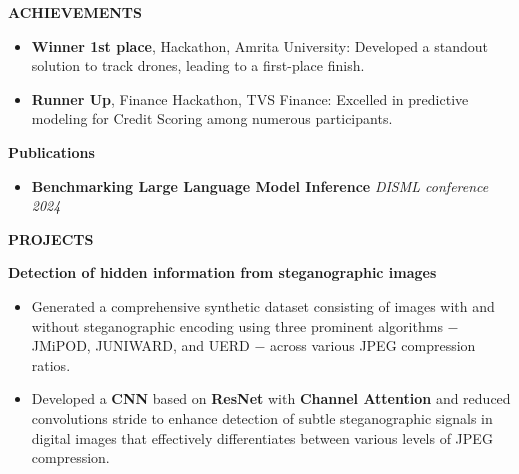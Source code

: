 \documentclass[10pt,a4]{article}
\begin{document}
{\begin{flushleft}
\end{flushleft}


\begin{flushleft}
        {\Large \textbf{ACHIEVEMENTS}}
        \vspace{1.5mm}
            \begin{itemize}
            \item \textbf{Winner 1st place}, Hackathon, Amrita University: Developed a standout solution to track drones, leading to a first-place finish.
            \item \textbf{Runner Up}, Finance Hackathon, TVS Finance: Excelled in predictive modeling for Credit Scoring among numerous participants.
            \end{itemize}
        
        \vspace{1mm}
        {\large \textbf{Publications}} \\
        \vspace{0.5mm}
        \begin{itemize}
            \item \textbf{Benchmarking Large Language Model Inference} \hfill \textit{DISML conference 2024}
        \end{itemize}
\end{flushleft}

\begin{flushleft}
    {\Large \textbf{PROJECTS}}
    \vspace{1mm}
    \item \textbf{\large Detection of hidden information from steganographic images}
        \vspace{0.5mm}
        \begin{itemize}
            \item Generated a comprehensive synthetic dataset consisting of images with and without steganographic encoding using three prominent algorithms $-$ JMiPOD, JUNIWARD, and UERD $-$ across various JPEG compression ratios.
            \item Developed a \textbf{CNN} based on \textbf{ResNet} with \textbf{Channel Attention} and reduced convolutions stride to enhance detection of subtle steganographic signals in digital images that effectively differentiates between various levels of JPEG compression.
            

\end{itemize}
\end{flushleft}}
\end{document}
